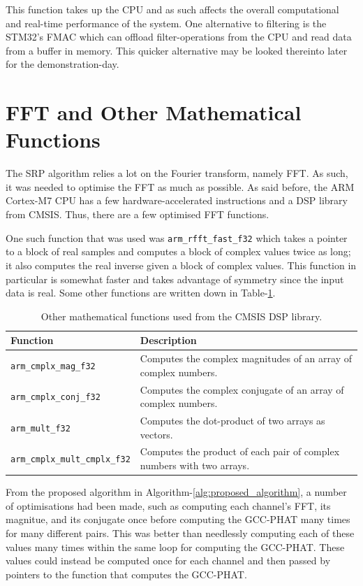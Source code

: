 \documentclass[notitlepage]{report}
\begin{document}
This function takes up the CPU and as such affects the overall computational and real-time performance of the system. One alternative to filtering is the STM32's FMAC which can offload filter-operations from the CPU and read data from a buffer in memory\cite{noauthor_stm32h723733_2021}. This quicker alternative may be looked thereinto later for the demonstration-day.

\section{FFT and Other Mathematical Functions}

The SRP algorithm relies a lot on the Fourier transform, namely FFT. As such, it was needed to optimise the FFT as much as possible. As said before, the ARM Cortex-M7 CPU has a few hardware-accelerated instructions and a DSP library from CMSIS. Thus, there are a few optimised FFT functions.

One such function that was used was \texttt{arm\_rfft\_fast\_f32} which takes a pointer to a block of real samples and computes a block of complex values twice as long; it also computes the real inverse given a block of complex values. This function in particular is somewhat faster and takes advantage of symmetry since the input data is real. Some other functions are written down in Table-\ref{tab:dsp_functions}.

\begin{table}[H]
\caption{Other mathematical functions used from the CMSIS DSP library.}
\label{tab:dsp_functions}
\centering
\begin{tabular}{p{} p{}}
	\hline
	Function							& Description	\\
	\hline
	\hline
	\texttt{arm\_cmplx\_mag\_f32}	
	& Computes the complex magnitudes of an array of complex numbers. \\
	\hline
	\texttt{arm\_cmplx\_conj\_f32}
	& Computes the complex conjugate of an array of complex numbers. \\
	\hline
	\texttt{arm\_mult\_f32}
	& Computes the dot-product of two arrays as vectors. \\
	\hline
	\texttt{arm\_cmplx\_mult\_cmplx\_f32}
	& Computes the product of each pair of complex numbers with two arrays. \\
	\hline
\end{tabular}
\centering
\end{table}

From the proposed algorithm in Algorithm-\ref{alg:proposed_algorithm}, a number of optimisations had been made, such as computing each channel's FFT, its magnitue, and its conjugate once before computing the GCC-PHAT many times for many different pairs. This was better than needlessly computing each of these values many times within the same loop for computing the GCC-PHAT. These values could instead be computed once for each channel and then passed by pointers to the function that computes the GCC-PHAT.
\end{document}

